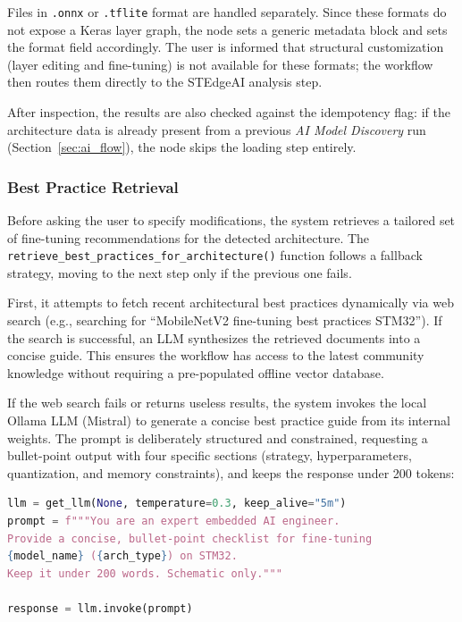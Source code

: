 Files in \texttt{.onnx} or \texttt{.tflite} format are handled separately. Since these formats do not expose a Keras layer graph, the node sets a generic metadata block and sets the format field accordingly. The user is informed that structural customization (layer editing and fine-tuning) is not available for these formats; the workflow then routes them directly to the STEdgeAI analysis step.

After inspection, the results are also checked against the idempotency flag: if the architecture data is already present from a previous \textit{AI Model Discovery} run (Section~\ref{sec:ai_flow}), the node skips the loading step entirely.

\subsubsection{Best Practice Retrieval}
\label{sec:best_practices}

Before asking the user to specify modifications, the system retrieves a tailored set of fine-tuning recommendations for the detected architecture. The \texttt{retrieve\_\allowbreak best\_\allowbreak practices\_\allowbreak for\_\allowbreak architecture()} function follows a fallback strategy, moving to the next step only if the previous one fails.

First, it attempts to fetch recent architectural best practices dynamically via web search (e.g., searching for ``MobileNetV2 fine-tuning best practices STM32''). If the search is successful, an LLM synthesizes the retrieved documents into a concise guide. This ensures the workflow has access to the latest community knowledge without requiring a pre-populated offline vector database.

If the web search fails or returns useless results, the system invokes the local Ollama LLM (Mistral) to generate a concise best practice guide from its internal weights. The prompt is deliberately structured and constrained, requesting a bullet-point output with four specific sections (strategy, hyperparameters, quantization, and memory constraints), and keeps the response under 200 tokens:

\begin{lstlisting}[language=Python, caption={LLM-based best practice generation fallback}, label={lst:rag_gen}]
llm = get_llm(None, temperature=0.3, keep_alive="5m")
prompt = f"""You are an expert embedded AI engineer.
Provide a concise, bullet-point checklist for fine-tuning
{model_name} ({arch_type}) on STM32.
Keep it under 200 words. Schematic only."""

response = llm.invoke(prompt)
\end{lstlisting}

